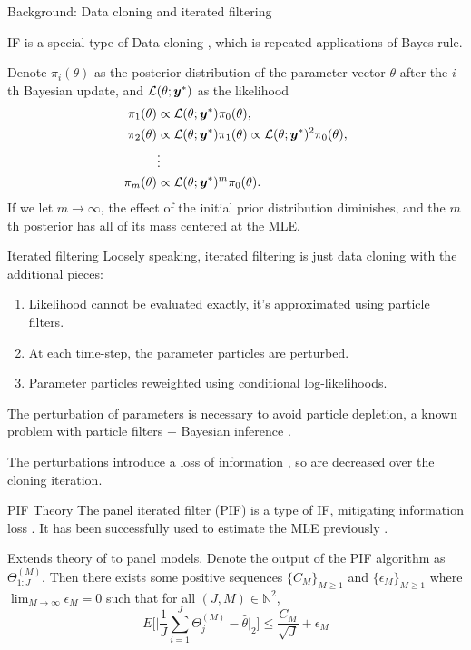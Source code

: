 \documentclass[aspectratio=169]{beamer}\usepackage[]{graphicx}\usepackage[]{xcolor}
\begin{document}
\begin{frame}{Background: Data cloning and iterated filtering}
  
  IF is a special type of Data cloning \citep{lele07}, which is repeated applications of Bayes rule. 
  
  Denote $\pi_i(\theta)$ as the posterior distribution of the parameter vector $\theta$ after the $i$th Bayesian update, and $\mathcal{L}(\theta; \bm{y}^*)$ as the likelihood
\begin{align*}
\pi_1(\theta) &\propto \mathcal{L}(\theta; \bm{y}^*)\pi_0(\theta), \\
\pi_2(\theta) &\propto \mathcal{L}(\theta; \bm{y}^*)\pi_1(\theta) \propto \mathcal{L}(\theta; \bm{y}^*)^2\pi_0(\theta),\\
&\vdots\\
\pi_m(\theta) &\propto \mathcal{L}(\theta; \bm{y}^*)^m\pi_0(\theta).
\end{align*}
If we let $m\rightarrow \infty$, the effect of the initial prior distribution diminishes, and the $m$th posterior has all of its mass centered at the MLE.

\end{frame}

\begin{frame}{Iterated filtering}
  Loosely speaking, iterated filtering is just data cloning with the additional pieces: 
  \begin{enumerate}
    \item Likelihood cannot be evaluated exactly, it's approximated using particle filters. 
    \item At each time-step, the parameter particles are perturbed.
    \item Parameter particles reweighted using conditional log-likelihoods.
  \end{enumerate}
  The perturbation of parameters is necessary to avoid particle depletion, a known problem with particle filters + Bayesian inference \citep{chen24}.
  
  The perturbations introduce a loss of information \citep{liu01}, so are decreased over the cloning iteration.
\end{frame}

\begin{frame}{PIF Theory}
  The panel iterated filter (PIF) is a type of IF, mitigating information loss \citep{breto20}. 
  It has been successfully used to estimate the MLE previously \citep[e.g.,][]{domeyer22}.
  
  \begin{theorem}
    Extends theory of \citet{chen24} to panel models. Denote the output of the PIF algorithm as $\Theta_{1:J}^{(M)}$.
  Then there exists some positive sequences $\{C_M\}_{M \geq 1}$ and $\{\epsilon_M\}_{M \geq 1}$ where $\lim_{M \rightarrow \infty}\epsilon_M = 0$ such that for all $(J, M) \in \mathbb{N}^2$,
  $$
  E\bigg[\Big|\frac{1}{J}\sum_{i=1}^J \Theta_j^{(M)} - \hat{\theta}\Big|_2\bigg] \leq \frac{C_M}{\sqrt{J}} + \epsilon_M
  $$
  \end{theorem}
  
\end{frame}
\end{document}
